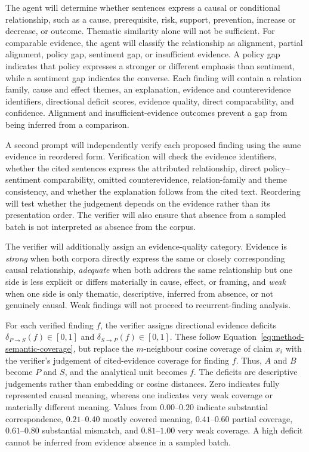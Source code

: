 The agent will determine whether sentences express a causal or conditional
relationship, such as a cause, prerequisite, risk, support, prevention, increase or
decrease, or outcome. Thematic similarity alone will not be sufficient. For
comparable evidence, the agent will classify the relationship as alignment, partial
alignment, policy gap, sentiment gap, or insufficient evidence. A policy gap
indicates that policy expresses a stronger or different emphasis than sentiment,
while a sentiment gap indicates the converse. Each finding will contain a relation
family, cause and effect themes, an explanation, evidence and counterevidence
identifiers, directional deficit scores, evidence quality, direct comparability, and
confidence. Alignment and insufficient-evidence outcomes prevent a gap from being
inferred from a comparison.

A second prompt will independently verify each proposed finding using the same
evidence in reordered form. Verification will check the evidence identifiers, whether
the cited sentences express the attributed relationship, direct policy--sentiment
comparability, omitted counterevidence, relation-family and theme consistency, and
whether the explanation follows from the cited text. Reordering will test whether the
judgement depends on the evidence rather than its presentation order. The verifier
will also ensure that absence from a sampled batch is not interpreted as absence from
the corpus.

The verifier will additionally assign an evidence-quality category. Evidence is
\textit{strong} when both corpora directly express the same or closely corresponding
causal relationship, \textit{adequate} when both address the same relationship but
one side is less explicit or differs materially in cause, effect, or framing, and
\textit{weak} when one side is only thematic, descriptive, inferred from absence, or
not genuinely causal. Weak findings will not proceed to recurrent-finding analysis.

For each verified finding $f$, the verifier assigns directional evidence deficits
$\delta_{P\rightarrow S}(f)\in[0,1]$ and $\delta_{S\rightarrow P}(f)\in[0,1]$. These
follow Equation~\ref{eq:method-semantic-coverage}, but replace the $m$-neighbour
cosine coverage of claim $x_i$ with the verifier's judgement of cited-evidence
coverage for finding $f$. Thus, $A$ and $B$ become $P$ and $S$, and the analytical
unit becomes $f$. The deficits are descriptive judgements rather than embedding or
cosine distances. Zero indicates fully represented causal meaning, whereas one
indicates very weak coverage or materially different meaning. Values from
$0.00$--$0.20$ indicate substantial correspondence, $0.21$--$0.40$ mostly covered
meaning, $0.41$--$0.60$ partial coverage, $0.61$--$0.80$ substantial mismatch, and
$0.81$--$1.00$ very weak coverage. A high deficit cannot be inferred from evidence
absence in a sampled batch. 


